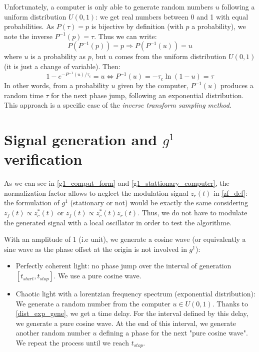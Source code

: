 \documentclass[10pt]{report}
\begin{document}
Unfortunately, a computer is only able to generate random numbers $u$ following a uniform distribution $U(0,1)$: we get real numbers between 0 and 1 with equal probabilities. As $P(\tau) = p$ is bijective by definition (with $p$ a probability), we note the inverse $P^{-1}(p) = \tau$. Thus we can write:
\begin{equation}
P(P^{-1}(p)) = p \Rightarrow P(P^{-1}(u)) = u
\end{equation}
where $u$ is a probability as $p$, but $u$ comes from the uniform distribution $U(0,1)$ (it is just a change of variable). Then:
\begin{equation}
\label{dist_exp_gene}
1-e^{-P^{-1}(u)/\tau_c} = u \Leftrightarrow P^{-1}(u) = -\tau_c \ln(1-u) = \tau
\end{equation}
In other words, from a probability $u$ given by the computer, $P^{-1}(u)$ produces a random time $\tau$ for the next phase jump, following an exponential distribution. This approach is a specific case of the \textit{inverse transform sampling method}.

\section{Signal generation and $g^1$ verification}

As we can see in \eqref{g1_comput_form} and \eqref{g1_stattionary_computer}, the normalization factor allows to neglect the modulation signal $z_r(t)$ in \eqref{zf_def}: the formulation of $g^1$ (stationary or not) would be exactly the same considering $z_f(t) \propto z_c^*(t)$ or $z_f(t) \propto z_c^*(t)z_r(t)$. Thus, we do not have to modulate the generated signal with a local oscillator in order to test the algorithme.

With an amplitude of $1$ (i.e unit), we generate a cosine wave (or equivalently a sine wave as the phase offset at the origin is not involved in $g^1$):
\begin{itemize}
	\item Perfectly coherent light: no phase jump over the interval of generation $\left[ t_{start}, t_{stop} \right]$. We use a pure cosine wave.
	\item Chaotic light with a lorentzian frequency spectrum (exponential distribution): We generate a random number from the computer $u \in U(0,1)$. Thanks to \eqref{dist_exp_gene}, we get a time delay. For the interval defined by this delay, we generate a pure cosine wave. At the end of this interval, we generate another random number $u$ defining a phase for the next "pure cosine wave". We repeat the process until we reach $t_{stop}$.
\end{itemize}
\end{document}
